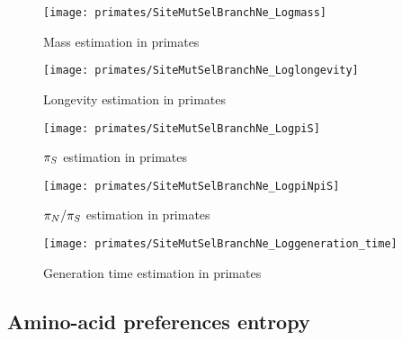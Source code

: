 \begin{figure}[H]
    \centering
    \texttt{[image: primates/SiteMutSelBranchNe\_Logmass]}
    \caption[Mass estimation in primates]{Mass estimation in primates}
\end{figure}

\begin{figure}[H]
    \centering
    \texttt{[image: primates/SiteMutSelBranchNe\_Loglongevity]}
    \caption[Longevity estimation in primates]{Longevity estimation in primates}
\end{figure}

\begin{figure}[H]
    \centering
    \texttt{[image: primates/SiteMutSelBranchNe\_LogpiS]}
    \caption[$\ps$ estimation in primates]{$\ps$ estimation in primates}
\end{figure}

\begin{figure}[H]
    \centering
    \texttt{[image: primates/SiteMutSelBranchNe\_LogpiNpiS]}
    \caption[$\pnps$ estimation in primates]{$\pnps$ estimation in primates}
\end{figure}

\begin{figure}[H]
    \centering
    \texttt{[image: primates/SiteMutSelBranchNe\_Loggeneration\_time]}
    \caption[Generation time estimation in primates]{Generation time estimation in primates}
\end{figure}

\subsection{Amino-acid preferences entropy}

\begin{table}[H]
    \centering
    \noindent{}
    \caption[Amino-acid entropy in primates]{Estimated amino-acid entropy in primates.
    Obtained with the mechanistic inference model developed in this paper of site-specific amino-acid fitness profiles and log-Brownian process for $\Ne$, $\mu$ and life-history traits (in the left column), or under the assumption of constant $\Ne$ (in the right column).}
\end{table}

